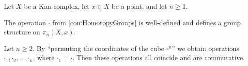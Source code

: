 \begin{lem}\label{lem:HomotopyGroups}
	Let $X$ be a Kan complex, let $x\in X$ be a point, and let $n\geqslant 1$.
	\begin{alphanumerate}
		\item The operation $\cdot$ from \cref{con:HomotopyGroups} is well-defined  and defines a group structure on $\pi_n(X,x)$.\label{enum:HomotopyGroupsWellDefined}
		\item Let $n\geqslant 2$. By \enquote{permuting the coordinates of the cube $\square^n$} we obtain operations $\boldsymbol{\cdot}_1,\boldsymbol{\cdot}_2,\dotsc,\boldsymbol{\cdot}_n$, where $\boldsymbol{\cdot}_1=\boldsymbol{\cdot}$. Then these operations all coincide and are commutative.\label{enum:EckmannHilton}
	\end{alphanumerate}
\end{lem}
